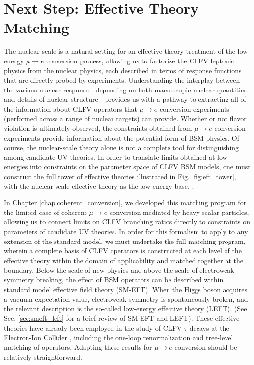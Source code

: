 \documentclass[12pt,letterpaper]{book}
\begin{document}
\section{Next Step: Effective Theory Matching}
The nuclear scale is a natural setting for an effective theory treatment of the low-energy $\mu\rightarrow e$ conversion process, allowing us to factorize the CLFV leptonic physics from the nuclear physics, each described in terms of response functions that are directly probed by experiments. Understanding the interplay between the various nuclear response---depending on both macroscopic nuclear quantities and details of nuclear structure---provides us with a pathway to extracting all of the information about CLFV operators that $\mu\rightarrow e$ conversion experiments (performed across a range of nuclear targets) can provide. Whether or not flavor violation is ultimately observed, the constraints obtained from $\mu\rightarrow e$ conversion experiments provide information about the potential form of BSM physics. Of course, the nuclear-scale theory alone is not a complete tool for distinguishing among candidate UV theories. In order to translate limits obtained at low energies into constraints on the parameter space of CLFV BSM models, one must construct the full tower of effective theories illustrated in Fig. \ref{fig:eft_tower}, with the nuclear-scale effective theory as the low-energy base, .

In Chapter \ref{chap:coherent_conversion}, we developed this matching program for the limited case of coherent $\mu\rightarrow e$ conversion mediated by heavy scalar particles, allowing us to connect limits on CLFV branching ratios directly to constraints on parameters of candidate UV theories. In order for this formalism to apply to any extension of the standard model, we must undertake the full matching program, wherein a complete basis of CLFV operators is constructed at each level of the effective theory within the domain of applicability and matched together at the boundary. Below the scale of new physics and above the scale of electroweak symmetry breaking, the effect of BSM operators can be described within standard model effective field theory (SM-EFT). When the Higgs boson acquires a vacuum expectation value, electroweak symmetry is spontaneously broken, and the relevant description is the so-called low-energy effective theory (LEFT). (See Sec. \ref{sec:smeft_left} for a brief review of SM-EFT and LEFT). These effective theories have already been employed in the study of CLFV $\tau$ decays at the Electron-Ion Collider \cite{Cirigliano:2021img}, including the one-loop renormalization and tree-level matching of operators. Adapting these results for $\mu\rightarrow e$ conversion should be relatively straightforward.
\end{document}

